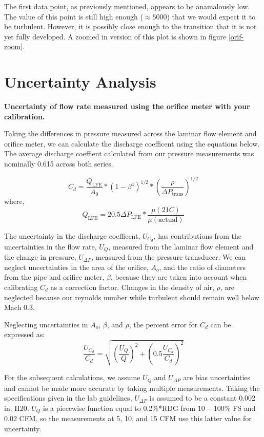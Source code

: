 \documentclass{article}
\begin{document}
The first data point, as previously mentioned, appears to be anamalously low. The value of this point is 
still high enough ($\approx 5000$) that we would expect it to be turbulent. However, it is possibly close enough 
to the transition that it is not yet fully developed. A zoomed in version of this plot is shown in figure \ref{orif-zoom}. 

\newpage
\section{Uncertainty Analysis}

\textbf{Uncertainty of flow rate measured using the orifice meter with
your calibration.} 

Taking the differences in pressure measured across the laminar flow element and orifice meter, 
we can calculate the discharge coefficent using the equations below. The average discharge coeffient 
calculated from our pressure measurements was nominally 0.615 across both series.

\begin{equation}
  C_d = \frac{Q_{\text{LFE}} }{A_0} * (1-\beta^4)^{1/2} * \left(\frac{\rho}{\Delta P_{\text{trans}}}\right)^{1/2}
\end{equation}
where, 
\begin{equation}
  Q_{\text{LFE}} = 20.5 \Delta P_{\text{LFE}} * \frac{\mu(21 C)}{\mu(\text{actual})}
\end{equation}

The uncertainty in the discharge coefficent, $U_{C_d}$, has contributions from the uncertainties in
the flow rate, $U_Q$, measured from the laminar flow element and the change in pressure, $U_{\Delta P}$, 
measured from the pressure transducer. We can neglect uncertainties in the area of the orifice, $A_o$, 
and the ratio of diameters from the pipe and orifice meter, $\beta$, because they are taken into account 
when calibrating $C_d$ as a correction factor. Changes in the density of air, $\rho$, are neglected because our 
reynolds number while turbulent should remain well below Mach 0.3.

Neglecting uncertainties in $A_o$, $\beta$, and $\rho$, the percent error for $C_d$ can be expressed as:
\begin{equation}
  \frac{U_{C_d}}{C_d} = \sqrt{ \left(\frac{U_{Q}}{Q}\right)^2 + \left( 0.5 \frac{U_{C_d}}{C_d} \right)^2}
\end{equation}

For the subsequent calculations, we assume $U_Q$ and $U_{\Delta P}$ are bias uncertainties and cannot be 
made more accurate by taking multiple measurements. Taking the specifications given in the lab 
guidelines, $U_{\Delta P}$ is assumed to be a constant 0.002 in. H20. $U_Q$ is a piecewise function equal to 
0.2\%*RDG from $10-100\%$ FS and 0.02%
CFM, so the measurements at 5, 10, and 15 CFM use this latter value for uncertainty.
\end{document}
